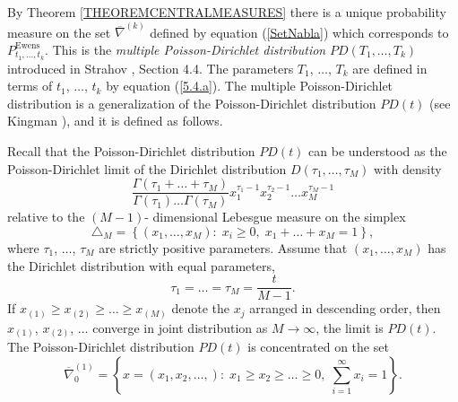 \documentclass[12pt]{amsart}
\theoremstyle{definition}
\numberwithin{equation}{section}
\DeclareMathOperator{\Ewens}{Ewens}
\begin{document}
By Theorem \ref{THEOREMCENTRALMEASURES}  there is a unique probability measure
on the set $\overline{\nabla}^{(k)}$ defined by equation (\ref{SetNabla})
which corresponds to $P_{t_1,\ldots,t_k}^{\Ewens}$. This is the \textit{multiple Poisson-Dirichlet distribution} $PD\left(T_1,\ldots,T_k\right)$ introduced in Strahov \cite{StrahovMPS}, Section 4.4. The parameters  $T_1$, $\ldots$, $T_k$ are defined in terms of $t_1$, $\ldots$, $t_k$ by equation (\ref{5.4.a}). The multiple Poisson-Dirichlet distribution is a generalization of the Poisson-Dirichlet distribution $PD(t)$ (see Kingman \cite{Kingman1}), and it is defined as follows.

Recall that  the Poisson-Dirichlet distribution $PD(t)$ can be understood as the Poisson-Dirichlet limit of the Dirichlet distribution $D(\tau_1,\ldots,\tau_M)$ with density
\begin{equation}\label{PoissonDirichletDensity}
\frac{\Gamma\left(\tau_1+\ldots+\tau_M\right)}{\Gamma\left(\tau_1\right)\ldots\Gamma\left(\tau_M\right)}
x_1^{\tau_1-1}x_2^{\tau_2-1}\ldots x_M^{\tau_M-1}
\end{equation}
relative to the $(M-1)$- dimensional Lebesgue measure on the simplex
$$
\triangle_M=\left\{(x_1,\ldots,x_M):\; x_i\geq 0,\; x_1+\ldots+x_M=1\right\},
$$
where $\tau_1$, $\ldots$, $\tau_M$ are strictly positive parameters.
Assume that $(x_1,\ldots,x_M)$ has the Dirichlet distribution with equal parameters,
$$
\tau_1=\ldots=\tau_M=\frac{t}{M-1}.
$$
If
$
x_{(1)}\geq x_{(2)}\geq\ldots\geq x_{(M)}
$
denote the $x_j$ arranged in descending order, then $x_{(1)}$, $x_{(2)}$, $\ldots$ converge in joint distribution
as $M\longrightarrow\infty$, the limit is $PD(t)$. The Poisson-Dirichlet distribution
$PD(t)$ is concentrated on the set
\begin{equation}\label{nablazero}
\overline{\nabla}_0^{(1)}=\left\{x=\left(x_1,x_2,\ldots,\right):\;
x_1\geq x_2\geq\ldots\geq 0,\;\sum\limits_{i=1}^{\infty}x_i=1\right\}.
\end{equation}
\end{document}
